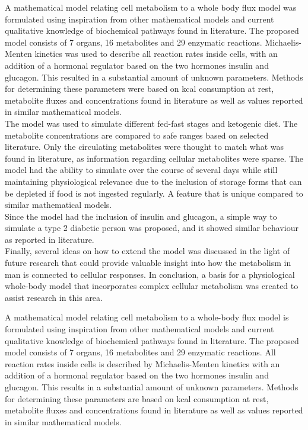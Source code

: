 
A mathematical model relating cell metabolism to a whole body flux model was formulated using inspiration from other mathematical models and current qualitative knowledge of biochemical pathways found in literature. The proposed model consists of 7 organs, 16 metabolites and 29 enzymatic reactions. Michaelis-Menten kinetics was used to describe all reaction rates inside cells, with an addition of a hormonal regulator based on the two hormones insulin and glucagon. This resulted in a substantial amount of unknown parameters. Methods for determining these parameters were based on kcal consumption at rest, metabolite fluxes and concentrations found in literature as well as values reported in similar mathematical models. \\

The model was used to simulate different fed-fast stages and ketogenic diet. The metabolite concentrations are compared to safe ranges based on selected literature. Only the circulating metabolites were thought to match what was found in literature, as information regarding cellular metabolites were sparse. The model had the ability to simulate over the course of several days while still maintaining physiological relevance due to the inclusion of storage forms that can be depleted if food is not ingested regularly. A feature that is unique compared to similar mathematical models. \\

Since the model had the inclusion of insulin and glucagon, a simple way to simulate a type 2 diabetic person was proposed, and it showed similar behaviour as reported in literature. \\

Finally, several ideas on how to extend the model was discussed in the light of future research that could provide valuable insight into how the metabolism in man is connected to cellular responses. In conclusion, a basis for a physiological whole-body model that incorporates complex cellular metabolism was created to assist research in this area.





A mathematical model relating cell metabolism to a whole-body flux model is formulated using inspiration from other mathematical models and current qualitative knowledge of biochemical pathways found in literature. The proposed model consists of 7 organs, 16 metabolites and 29 enzymatic reactions. All reaction rates inside cells is described by Michaelis-Menten kinetics with an addition of a hormonal regulator based on the two hormones insulin and glucagon. This results in a substantial amount of unknown parameters. Methods for determining these parameters are based on kcal consumption at rest, metabolite fluxes and concentrations found in literature as well as values reported in similar mathematical models. \\

